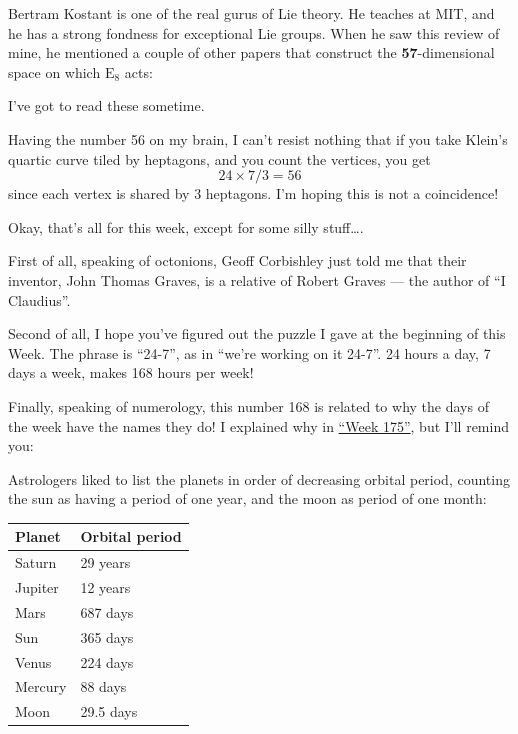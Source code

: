 \documentclass{article}
\renewcommand{\texttt}[1]{%
  \begingroup
  \ttfamily
  \begingroup\lccode`~=`/\lowercase{\endgroup\def~}{/\discretionary{}{}{}}%
  \begingroup\lccode`~=`[\lowercase{\endgroup\def~}{[\discretionary{}{}{}}%
  \begingroup\lccode`~=`.\lowercase{\endgroup\def~}{.\discretionary{}{}{}}%
  \catcode`/=\active\catcode`[=\active\catcode`.=\active
  \scantokens{#1\noexpand}%
  \endgroup
}
\begin{document}
Bertram Kostant is one of the real gurus of Lie theory. He teaches at
MIT, and he has a strong fondness for exceptional Lie groups. When he
saw this review of mine, he mentioned a couple of other papers that
construct the \textbf{57}-dimensional space on which \(\mathrm{E}_8\)
acts:


I've got to read these sometime.

Having the number 56 on my brain, I can't resist nothing that if you
take Klein's quartic curve tiled by heptagons, and you count the
vertices, you get \[24 \times 7 / 3 = 56\] since each vertex is shared
by 3 heptagons. I'm hoping this is not a coincidence!

Okay, that's all for this week, except for some silly stuff\ldots.

First of all, speaking of octonions, Geoff Corbishley just told me that
their inventor, John Thomas Graves, is a relative of Robert Graves ---
the author of ``I Claudius''.

Second of all, I hope you've figured out the puzzle I gave at the
beginning of this Week. The phrase is ``24-7'', as in ``we're working on
it 24-7''. 24 hours a day, 7 days a week, makes 168 hours per week!

Finally, speaking of numerology, this number 168 is related to why the
days of the week have the names they do! I explained why in
\protect\hyperlink{week175}{``Week 175''}, but I'll remind you:

Astrologers liked to list the planets in order of decreasing orbital
period, counting the sun as having a period of one year, and the moon as
period of one month:

\begin{longtable}[]{@{}ll@{}}
\toprule
Planet & Orbital period\tabularnewline
\midrule
\endhead
Saturn & 29 years\tabularnewline
Jupiter & 12 years\tabularnewline
Mars & 687 days\tabularnewline
Sun & 365 days\tabularnewline
Venus & 224 days\tabularnewline
Mercury & 88 days\tabularnewline
Moon & 29.5 days\tabularnewline
\bottomrule
\end{longtable}
\end{document}
